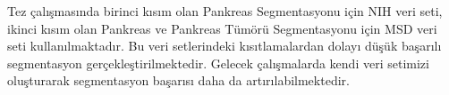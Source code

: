 Tez çalışmasında birinci kısım olan Pankreas Segmentasyonu için NIH veri seti, ikinci kısım olan Pankreas ve Pankreas Tümörü Segmentasyonu için MSD veri seti kullanılmaktadır. Bu veri setlerindeki kısıtlamalardan dolayı düşük başarılı segmentasyon gerçekleştirilmektedir. Gelecek çalışmalarda kendi veri setimizi oluşturarak segmentasyon başarısı daha da artırılabilmektedir. 

